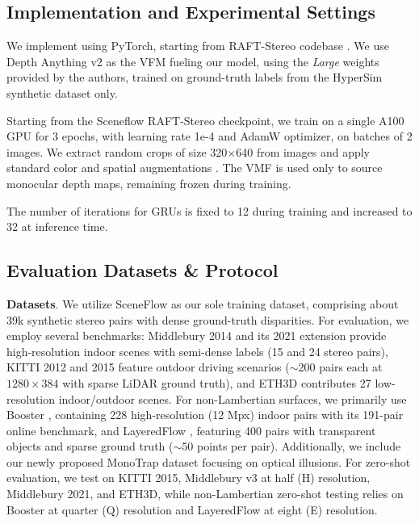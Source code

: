 \subsection{Implementation and Experimental Settings}

We implement \method using PyTorch, starting from RAFT-Stereo codebase \cite{lipson2021raft}.
We use Depth Anything v2 \cite{depth_anything_v2} as the VFM fueling our model, using the \textit{Large} weights provided by the authors, trained on ground-truth labels from the HyperSim synthetic dataset \cite{roberts2021} only. 

Starting from the Sceneflow RAFT-Stereo checkpoint, we train \method on a single A100 GPU for 3 epochs, with learning rate 1e-4 and AdamW optimizer, on batches of 2 images. We extract random crops of size 320$\times$640 from images and apply standard color and spatial augmentations \cite{lipson2021raft}. 
The VMF is used only to source monocular depth maps, remaining frozen during training.

The number of iterations for GRUs is fixed to 12 during training and increased to 32 at inference time.

\subsection{Evaluation Datasets \& Protocol}

\textbf{Datasets}. We utilize SceneFlow \cite{mayer2016large} as our sole training dataset, comprising about 39k synthetic stereo pairs with dense ground-truth disparities. For evaluation, we employ several benchmarks: Middlebury 2014 \cite{scharstein2014high} and its 2021 extension \cite{middlebury2021} provide high-resolution indoor scenes with semi-dense labels (15 and 24 stereo pairs), KITTI 2012 \cite{geiger2012we} and 2015 \cite{menze2015object} feature outdoor driving scenarios ($\sim$200 pairs each at $1280 \times 384$ with sparse LiDAR ground truth), and ETH3D \cite{schops2017multi} contributes 27 low-resolution indoor/outdoor scenes. For non-Lambertian surfaces, we primarily use Booster \cite{zamaramirez2022booster}, containing 228 high-resolution (12 Mpx) indoor pairs with its 191-pair online benchmark, and LayeredFlow \cite{wen2024layeredflow}, featuring 400 pairs with transparent objects and sparse ground truth ($\sim$50 points per pair). Additionally, we include our newly proposed MonoTrap dataset focusing on optical illusions. For zero-shot evaluation, we test on KITTI 2015, Middlebury v3 at half (H) resolution, Middlebury 2021, and ETH3D, while non-Lambertian zero-shot testing relies on Booster at quarter (Q) resolution and LayeredFlow at eight (E) resolution.

